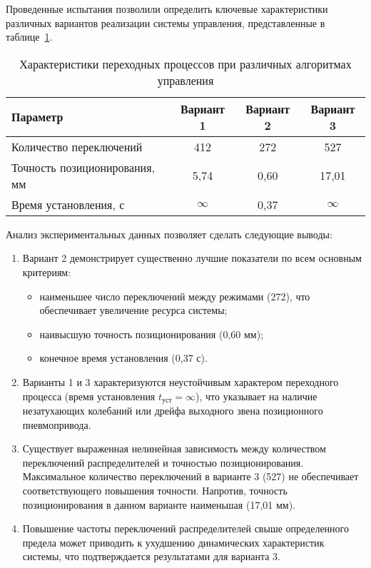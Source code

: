 Проведенные испытания позволили определить
ключевые характеристики различных вариантов реализации системы
управления, представленные в таблице~\ref{tab:transition_processes_pid}.

\begin{table}[h]
	\centering
	\caption{Характеристики переходных процессов при различных алгоритмах управления}
	\label{tab:transition_processes_pid}
	\small
	\begin{tabular}{lccc}
		\midrule
		\textbf{Параметр}             & \textbf{Вариант 1} & \textbf{Вариант 2} & \textbf{Вариант 3} \\
		\midrule
		Количество переключений       & 412                & 272                & 527                \\
		Точность позиционирования, мм & 5,74               & 0,60               & 17,01              \\
		Время установления, с         & $\infty$           & 0,37               & $\infty$           \\
		\midrule
	\end{tabular}
\end{table}

Анализ экспериментальных данных позволяет
сделать следующие выводы:

\begin{enumerate}
	\item Вариант 2 демонстрирует существенно лучшие показатели по всем основным критериям:
	      \begin{itemize}
		      \item наименьшее число переключений между режимами (272), что обеспечивает увеличение ресурса системы;
		      \item наивысшую точность позиционирования (0,60 мм);
		      \item конечное время установления (0,37 с).
	      \end{itemize}

	\item Варианты 1 и 3 характеризуются неустойчивым характером переходного процесса
	      (время установления $t_{уст} = \infty$), что указывает на наличие незатухающих колебаний или дрейфа выходного звена позиционного пневмопривода.

	\item Существует выраженная нелинейная зависимость между количеством переключений
	      распределителей и точностью позиционирования. Максимальное количество переключений в
	      варианте 3 (527) не обеспечивает соответствующего повышения точности. Напротив,
	      точность позиционирования в данном варианте наименьшая (17,01 мм).

	\item Повышение частоты переключений распределителей свыше определенного предела может
	      приводить к ухудшению динамических характеристик системы, что подтверждается
	      результатами для варианта 3.
\end{enumerate}

